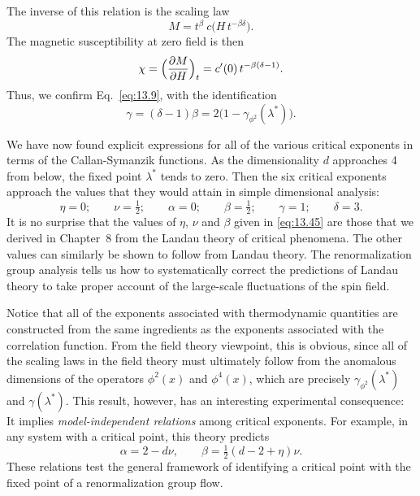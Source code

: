 The inverse of this relation is the scaling law
\begin{equation}
  M = t^{\beta}\ c\bigl( H\,t^{-\beta\delta} \bigr) .
  \label{eq:13.42}
\end{equation}
The magnetic susceptibility at zero field is then
\begin{equation}
  \chi = \Bigl( \frac{\partial M}{\partial H} \Bigr)_t
  = c'(0)\,t^{-\beta(\delta-1)} .
  \label{eq:13.43}
\end{equation}
Thus, we confirm Eq.~\eqref{eq:13.9}, with the identification
\begin{equation}
  \gamma = (\delta-1)\beta = 2\bigl( 1 - \gamma_{\phi^2}(\lambda^{*}) \bigr) .
  \label{eq:13.44}
\end{equation}

We have now found explicit expressions for all of the various critical
exponents in terms of the Callan-Symanzik functions.  As the dimensionality
$d$ approaches 4 from below, the fixed point $\lambda^{*}$ tends to zero.
Then the six critical exponents approach the values that they would attain in
simple dimensional analysis:
\begin{equation}
  \eta = 0;\qquad \nu = \tfrac{1}{2};\qquad \alpha = 0;\qquad
  \beta = \tfrac{1}{2};\qquad \gamma = 1;\qquad \delta = 3 .
  \label{eq:13.45}
\end{equation}
It is no surprise that the values of $\eta$, $\nu$ and $\beta$ given in
\eqref{eq:13.45} are those that we derived in Chapter~8 from the Landau
theory of critical phenomena.  The other values can similarly be shown to
follow from Landau theory.  The renormalization group analysis tells us how
to systematically correct the predictions of Landau theory to take proper
account of the large-scale fluctuations of the spin field.

Notice that all of the exponents associated with thermodynamic quantities are
constructed from the same ingredients as the exponents associated with the
correlation function.  From the field theory viewpoint, this is obvious,
since all of the scaling laws in the field theory must ultimately follow from
the anomalous dimensions of the operators $\phi^2(x)$ and $\phi^4(x)$, which
are precisely $\gamma_{\phi^2}(\lambda^{*})$ and $\gamma(\lambda^{*})$.  This
result, however, has an interesting experimental consequence: It implies
\emph{model-independent relations} among critical exponents.  For example, in
any system with a critical point, this theory predicts
\begin{equation}
  \alpha = 2 - d\nu,\qquad \beta = \tfrac{1}{2}(d-2+\eta)\nu .
  \label{eq:13.46}
\end{equation}
These relations test the general framework of identifying a critical point
with the fixed point of a renormalization group flow.

